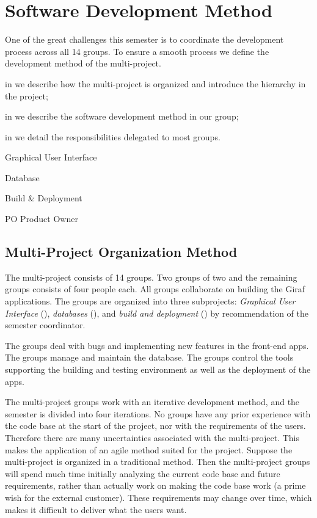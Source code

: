 \chapter{Software Development Method}\label{chap:sw_dev_method}
One of the great challenges this semester is to coordinate the development process across all 14 groups. To ensure a smooth process we define the development method of the multi-project.

\begin{chapterorganization}
  \item in  we describe how the multi-project is organized and introduce the hierarchy in the project;
  \item in  we describe the software development method in our group;
  \item in  we detail the responsibilities delegated to most groups.
\end{chapterorganization}

\begin{abbreviations}
  \item[\gui] Graphical User Interface
  \item[\db] Database
  \item[\bd] Build \& Deployment
  \item[PO] Product Owner
\end{abbreviations}

\section{Multi-Project Organization Method}\label{sec:project_overview}
The multi-project consists of 14 groups. Two groups of two and the remaining groups consists of four people each.  All groups collaborate on building the Giraf applications. The groups are organized into three subprojects: \emph{Graphical User Interface} (\gui), \emph{databases} (\db), and \emph{build and deployment} (\bd) by recommendation of the semester coordinator.

The \gui groups deal with bugs and implementing new features in the front-end apps. The \db groups manage and maintain the database. The \bd groups control the tools supporting the building and testing environment as well as the deployment of the apps.

The multi-project groups work with an iterative development method, and the semester is divided into four iterations. No groups have any prior experience with the code base at the start of the project, nor with the requirements of the users. Therefore there are many uncertainties associated with the multi-project. This makes the application of an agile method suited for the project. Suppose the multi-project is organized in a traditional method. Then the multi-project groups will spend much time initially analyzing the current code base and future requirements, rather than actually work on making the code base work (a prime wish for the external customer). These requirements may change over time, which makes it difficult to deliver what the users want.

